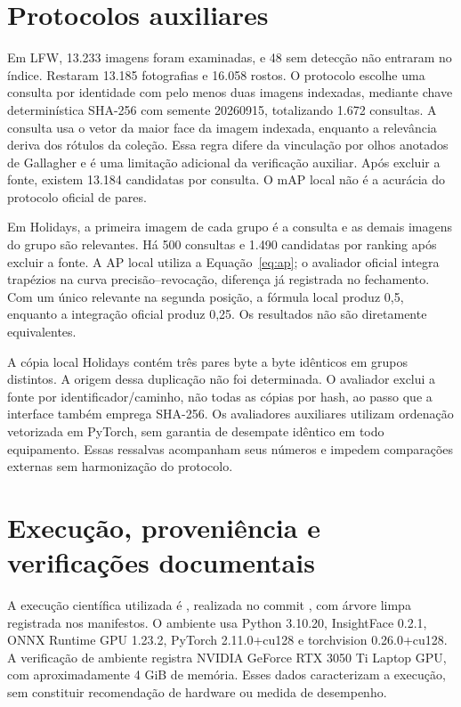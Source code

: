 \section{Protocolos auxiliares}
Em LFW, 13.233 imagens foram examinadas, e 48 sem detecção não entraram no índice. Restaram 13.185 fotografias e 16.058 rostos. O protocolo escolhe uma consulta por identidade com pelo menos duas imagens indexadas, mediante chave determinística SHA-256 com semente 20260915, totalizando 1.672 consultas. A consulta usa o vetor da maior face da imagem indexada, enquanto a relevância deriva dos rótulos da coleção. Essa regra difere da vinculação por olhos anotados de Gallagher e é uma limitação adicional da verificação auxiliar. Após excluir a fonte, existem 13.184 candidatas por consulta. O mAP local não é a acurácia do protocolo oficial de pares.

Em Holidays, a primeira imagem de cada grupo é a consulta e as demais imagens do grupo são relevantes. Há 500 consultas e 1.490 candidatas por ranking após excluir a fonte. A AP local utiliza a Equação~\ref{eq:ap}; o avaliador oficial integra trapézios na curva precisão--revocação, diferença já registrada no fechamento. Com um único relevante na segunda posição, a fórmula local produz 0,5, enquanto a integração oficial produz 0,25. Os resultados não são diretamente equivalentes.

A cópia local Holidays contém três pares byte a byte idênticos em grupos distintos. A origem dessa duplicação não foi determinada. O avaliador exclui a fonte por identificador/caminho, não todas as cópias por hash, ao passo que a interface também emprega SHA-256. Os avaliadores auxiliares utilizam ordenação vetorizada em PyTorch, sem garantia de desempate idêntico em todo equipamento. Essas ressalvas acompanham seus números e impedem comparações externas sem harmonização do protocolo.

\section{Execução, proveniência e verificações documentais}
A execução científica utilizada é , realizada no commit , com árvore limpa registrada nos manifestos. O ambiente usa Python 3.10.20, InsightFace 0.2.1, ONNX Runtime GPU 1.23.2, PyTorch 2.11.0+cu128 e torchvision 0.26.0+cu128. A verificação de ambiente registra NVIDIA GeForce RTX 3050 Ti Laptop GPU, com aproximadamente 4 GiB de memória. Esses dados caracterizam a execução, sem constituir recomendação de hardware ou medida de desempenho.

